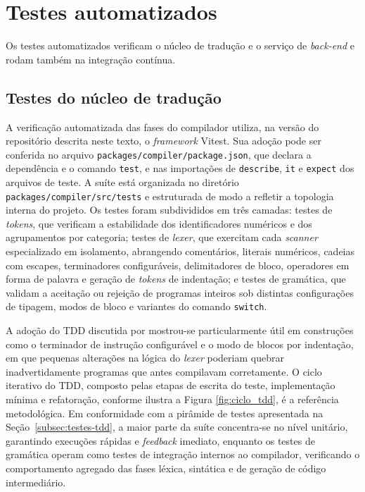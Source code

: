 \section{Testes automatizados}
\label{sec:metodologia-testes}\label{sec:testes-automatizados}

Os testes automatizados verificam o núcleo de tradução e o serviço de \textit{back-end} e rodam também na integração contínua.

\subsection{Testes do núcleo de tradução}
\label{subsec:testes-nucleo}

A verificação automatizada das fases do compilador utiliza, na versão do repositório descrita neste texto, o \textit{framework} Vitest. Sua adoção pode ser conferida no arquivo \texttt{packages/compiler/package.json}, que declara a dependência e o comando \texttt{test}, e nas importações de \texttt{describe}, \texttt{it} e \texttt{expect} dos arquivos de teste. A suíte está organizada no diretório \texttt{packages/}\allowbreak\texttt{compiler}\allowbreak\texttt{/src/tests} e estruturada de modo a refletir a topologia interna do projeto. Os testes foram subdivididos em três camadas: testes de \textit{tokens}, que verificam a estabilidade dos identificadores numéricos e dos agrupamentos por categoria; testes de \textit{lexer}, que exercitam cada \textit{scanner} especializado em isolamento, abrangendo comentários, literais numéricos, cadeias com escapes, terminadores configuráveis, delimitadores de bloco, operadores em forma de palavra e geração de \textit{tokens} de indentação; e testes de gramática, que validam a aceitação ou rejeição de programas inteiros sob distintas configurações de tipagem, modos de bloco e variantes do comando \texttt{switch}.

A adoção do TDD discutida por  mostrou-se particularmente útil em construções como o terminador de instrução configurável e o modo de blocos por indentação, em que pequenas alterações na lógica do \textit{lexer} poderiam quebrar inadvertidamente programas que antes compilavam corretamente. O ciclo iterativo do TDD, composto pelas etapas de escrita do teste, implementação mínima e refatoração, conforme ilustra a Figura \ref{fig:ciclo_tdd}, é a referência metodológica. Em conformidade com a pirâmide de testes apresentada na Seção~\ref{subsec:testes-tdd}, a maior parte da suíte concentra-se no nível unitário, garantindo execuções rápidas e \textit{feedback} imediato, enquanto os testes de gramática operam como testes de integração internos ao compilador, verificando o comportamento agregado das fases léxica, sintática e de geração de código intermediário.

